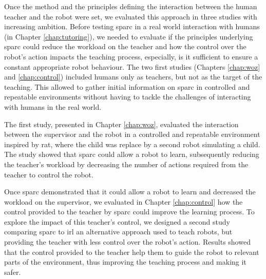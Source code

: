 Once the method and the principles defining the interaction between the human teacher and the robot were set, we evaluated this approach in three studies with increasing ambition. Before testing \gls{sparc} in a real world interaction with humans (in Chapter \ref{chap:tutoring}), we needed to evaluate if the principles underlying \gls{sparc} could reduce the workload on the teacher and how the control over the robot's action impacts the teaching process, especially, is it sufficient to ensure a constant appropriate robot behaviour. The two first studies (Chapters \ref{chap:woz} and \ref{chap:control}) included humans only as teachers, but not as the target of the teaching. This allowed to gather initial information on \gls{sparc} in controlled and repeatable environments without having to tackle the challenges of interacting with humans in the real world.

The first study, presented in Chapter \ref{chap:woz}, evaluated the interaction between the supervisor and the robot in a controlled and repeatable environment inspired by \gls{rat}, where the child was replace by a second robot simulating a child. The study showed that \gls{sparc} could allow a robot to learn, subsequently reducing the teacher's workload by decreasing the number of actions required from the teacher to control the robot.

Once \gls{sparc} demonstrated that it could allow a robot to learn and decreased the workload on the supervisor, we evaluated in Chapter \ref{chap:control} how the control provided to the teacher by \gls{sparc} could improve the learning process. To explore the impact of this teacher's control, we designed a second study comparing \gls{sparc} to \gls{irl} an alternative approach used to teach robots, but providing the teacher with less control over the robot's action. Results showed that the control provided to the teacher help them to guide the robot to relevant parts of the environment, thus improving the teaching process and making it safer.

